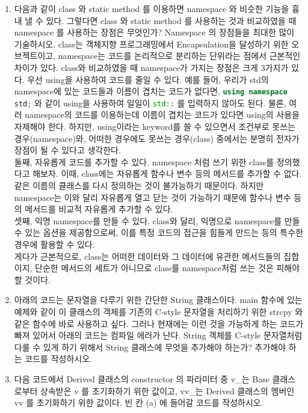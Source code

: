 \documentclass{article}
\newcommand{\inline}[1]{%
    \colorbox{beta-gray}{\lstinline[language=C++]{#1}}%
}
\begin{document}
\begin{enumerate}[itemsep=30pt]
        \item 다음과 같이 class 와 static method 를 이용하면 namespace 와 비슷한 기능을 흉내 낼 수 있다. 그렇다면 class 와 static method 를 사용하는 것과 비교하였을 때 namespace 를 사용하는 장점은 무엇인가? Namespace 의 장점들을 최대한 많이 기술하시오.
              class는 객체지향 프로그래밍에서 Encapsulation을 달성하기 위한 오브젝트이고, namespace는 코드를 논리적으로 분리하는 단위라는 점에서 근본적인 차이가 있다.
              class와 비교하였을 때 namespace가 가지는 장점은 크게 3가지가 있다. 우선 using을 사용하여 코드를 줄일 수 있다.
              예를 들어, 우리가 std의 namespace에 있는 코드들과 이름이 겹치는 코드가 없다면, \inline{using namespace std;}와 같이 using을 사용하여 일일이 \inline{std::}를 입력하지 않아도 된다.
              물론, 여러 namespace의 코드를 이용하는데 이름이 겹치는 코드가 있다면 using의 사용을 자제해야 한다. 하지만, using이라는 keyword를 쓸 수 있으면서 조건부로 못쓰는 경우(namespace)와, 어떠한 경우에도 못쓰는 경우(class) 중에서는 분명히 전자가 장점이 될 수 있다고 생각한다. \\
              둘째, 자유롭게 코드를 추가할 수 있다. namespace 처럼 쓰기 위한 class를 정의했다고 해보자.
              이때, class에는 자유롭게 함수나 변수 등의 메서드를 추가할 수 없다. 같은 이름의 클래스를 다시 정의하는 것이 불가능하기 때문이다.
              하지만 namespace는 이와 달리 자유롭게 열고 닫는 것이 가능하기 때문에 함수나 변수 등의 메서드를 비교적 자유롭게 추가할 수 있다.\\
              셋째, 익명 namespace를 만들 수 있다.
              class와 달리, 익명으로 namespace를 만들 수 있는 옵션을 제공함으로써, 이를 특정 코드의 접근을 힘들게 만드는 등의 특수한 경우에 활용할 수 있다.\\
              게다가 근본적으로, class는 어떠한 데이터와 그 데이터에 유관한 메서드들의 집합이지, 단순한 메서드의 세트가 아니므로 class를 namespace처럼 쓰는 것은 피해야 할 것이다.
        \item 아래의 코드는 문자열을 다루기 위한 간단한 String 클래스이다. main 함수에 있는 예제와 같이 이 클래스의 객체를 기존의 C-style 문자열을 처리하기 위한 strcpy 와 같은 함수에 바로 사용하고 싶다. 그러나 현재에는 이런 것을 가능하게 하는 코드가 빠져 있어서 아래의 코드는 컴파일 에러가 난다. String 객체를 C-style 문자열처럼 다룰 수 있게 하기 위해서 String 클래스에 무엇을 추가해야 하는가? 추가해야 하는 코드를 작성하시오.
        \item 다음 코드에서 Derived 클래스의 constructor 의 파라미터 중 v\_는 Base 클래스로부터 상속받은 v 를 초기화하기 위한 값이고, vv\_는 Derived 클래스의 멤버인 vv 를 초기화하기 위한 값이다. 빈 칸 (a) 에 들어갈 코드를 작성하시오.

\end{enumerate}
\end{document}
